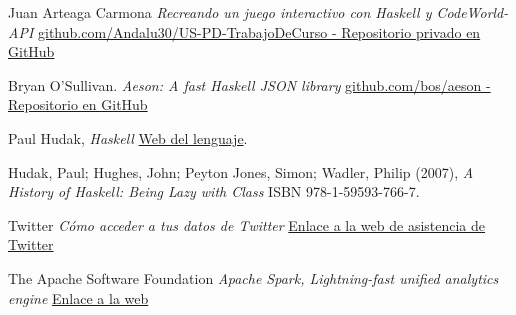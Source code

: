 \documentclass[11pt]{article}
\begin{document}
\begin{thebibliography}{99}

 Juan Arteaga Carmona \textit{Recreando un juego interactivo con Haskell y CodeWorld-API} \href{https://github.com/Andalu30/US-PD-TrabajoDeCurso}{github.com/Andalu30/US-PD-TrabajoDeCurso - Repositorio privado en GitHub}

 Bryan O'Sullivan. \textit{Aeson: A fast Haskell JSON library} \href{https://github.com/bos/aeson}{github.com/bos/aeson - Repositorio en GitHub}

 Paul Hudak, \textit{Haskell} \href{https://www.haskell.org/}{ Web del lenguaje}.

 Hudak, Paul; Hughes, John; Peyton Jones, Simon; Wadler, Philip (2007), \textit{A History of Haskell: Being Lazy with Class} ISBN 978-1-59593-766-7.

 Twitter \textit{Cómo acceder a tus datos de Twitter} \href{https://help.twitter.com/es/managing-your-account/accessing-your-twitter-data}{Enlace a la web de asistencia de Twitter}

 The Apache Software Foundation \textit{Apache Spark, Lightning-fast unified analytics engine} \href{https://spark.apache.org
}{Enlace a la web}




\end{thebibliography}
\end{document}
